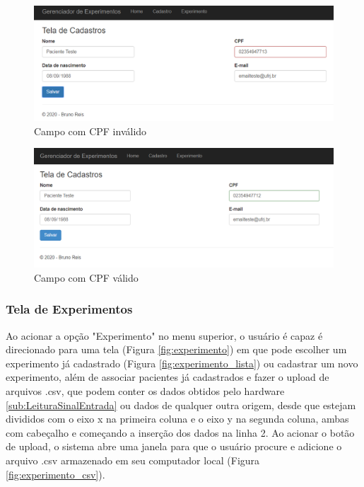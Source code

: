  \begin{figure}[h!]
	\begin{center}
		\includegraphics[width=0.8\linewidth]{images/cpf_invalido.png}
		\caption{Campo com CPF inválido}
		\label{fig:cpf_invalido}
	\end{center}
\end{figure}

  \begin{figure}[h!]
	\begin{center}
		\includegraphics[width=0.8\linewidth]{images/cpf_valido.png}
		\caption{Campo com CPF válido}
		\label{fig:cpf_valido}
	\end{center}
\end{figure}

\subsubsection{Tela de Experimentos} \label{sec:tela_experimentos}

Ao acionar a opção "Experimento" no menu superior, o usuário é capaz é direcionado para uma tela (Figura \ref{fig:experimento}) em que pode escolher um experimento já cadastrado (Figura \ref{fig:experimento_lista}) ou cadastrar um novo experimento, além de associar pacientes já cadastrados e fazer o upload de arquivos .csv, que podem conter os dados obtidos pelo hardware \ref{sub:LeituraSinalEntrada} ou dados de qualquer outra origem, desde que estejam divididos com o eixo x na primeira coluna e o eixo y na segunda coluna, ambas com cabeçalho e começando a inserção dos dados na linha 2. Ao acionar o botão de upload, o sistema abre uma janela para que o usuário procure e adicione o arquivo .csv armazenado em seu computador local (Figura \ref{fig:experimento_csv}).


